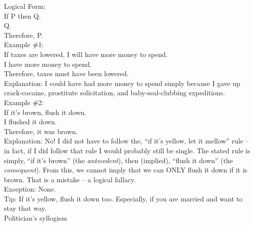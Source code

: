 \documentclass[a4paper,12pt,single,pdftex]{scrartcl}
\begin{document}
    
      Logical Form:
    \\

    
      If P then Q.
    \\

    
      Q.
    \\

    
      Therefore, P.
    \\

    
      Example \#1:
    \\

    
      If taxes are lowered, I will have more money to spend.
    \\

    
      I have more money to spend.
    \\

    
      Therefore, taxes must have been lowered.
    \\

    
      Explanation: I could have had more money to spend simply because I gave up crack-cocaine, prostitute solicitation, and baby-seal-clubbing expeditions.
    \\

    
      Example \#2:
    \\

    
      If it’s brown, flush it down.
    \\

    
      I flushed it down.
    \\

    
      Therefore, it was brown.
    \\

    
      Explanation: No!  I did not have to follow the, “if it’s yellow, let it mellow” rule -- in fact, if I did follow that rule I would probably still be single.  The stated rule is simply, “if it’s brown” (the {\it antecedent}), then (implied), “flush it down” (the {\it consequent}).  From this, we cannot imply that we can ONLY flush it down if it is brown.  That is a mistake -- a logical fallacy.
    \\

    
      Exception: None.
    \\

    
      Tip: If it’s yellow, flush it down too. Especially, if you are married and want to stay that way.
    \\

  

Politician's syllogism
    
\end{document}
